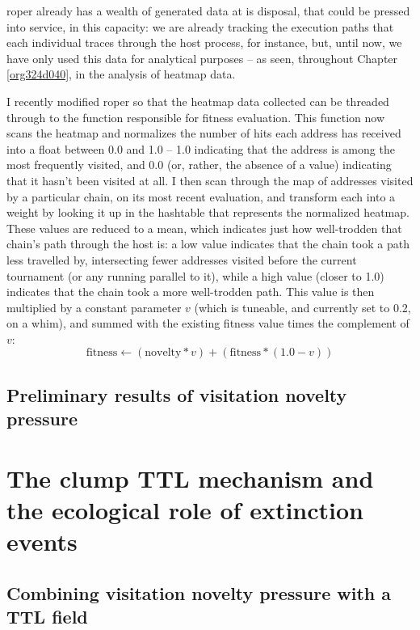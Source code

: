 \documentclass[12pt,glossary]{dalthesis}
\begin{document}
\Gls{roper} already has a wealth of generated data at is disposal, that could be
pressed into service, in this capacity: we are already tracking the execution
paths that each individual traces through the host process, for instance, but,
until now, we have only used this data for analytical purposes -- as seen,
throughout Chapter \ref{org324d040}, in the analysis of heatmap data. 

I recently modified \gls{roper} so that the heatmap data collected can be threaded
through to the function responsible for fitness evaluation. This function now
scans the heatmap and normalizes the number of hits each address has received
into a float between 0.0 and 1.0 -- 1.0 indicating that the address is among
the most frequently visited, and 0.0 (or, rather, the absence of a value) 
indicating that it hasn't been visited at all. I then scan through the map of
addresses visited by a particular chain, on its most recent evaluation, and 
transform each into a weight by looking it up in the hashtable that represents
the normalized heatmap. These values are reduced to a mean, which indicates 
just how well-trodden that chain's path through the host is: a low value 
indicates that the chain took a path less travelled by, intersecting fewer
addresses visited before the
current tournament (or any running parallel to it), while a high value (closer
to 1.0) indicates that the chain took a more well-trodden path. This value
is then multiplied by a constant parameter \(v\) (which is tuneable, and currently
set to 0.2, on a whim), and summed with the existing fitness value times the
complement of \(v\): 
$$ \text{fitness} \gets (\text{novelty} * v) + (\text{fitness} * (1.0 - v))$$

\subsection{Preliminary results of visitation novelty pressure}
\label{sec:org3ae4cb1}

\section{The clump TTL mechanism and the ecological role of extinction events}
\label{sec:org87861ec}

\subsection{Combining visitation novelty pressure with a TTL field}
\label{sec:org3a16f67}
\end{document}

